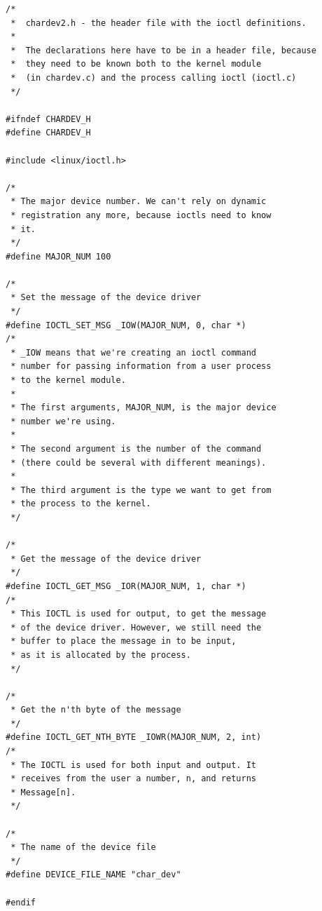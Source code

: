 \documentclass[11pt]{article}
\begin{document}
\begin{verbatim}
/*
 *  chardev2.h - the header file with the ioctl definitions.
 *
 *  The declarations here have to be in a header file, because
 *  they need to be known both to the kernel module
 *  (in chardev.c) and the process calling ioctl (ioctl.c)
 */

#ifndef CHARDEV_H
#define CHARDEV_H

#include <linux/ioctl.h>

/*
 * The major device number. We can't rely on dynamic
 * registration any more, because ioctls need to know
 * it.
 */
#define MAJOR_NUM 100

/*
 * Set the message of the device driver
 */
#define IOCTL_SET_MSG _IOW(MAJOR_NUM, 0, char *)
/*
 * _IOW means that we're creating an ioctl command
 * number for passing information from a user process
 * to the kernel module.
 *
 * The first arguments, MAJOR_NUM, is the major device
 * number we're using.
 *
 * The second argument is the number of the command
 * (there could be several with different meanings).
 *
 * The third argument is the type we want to get from
 * the process to the kernel.
 */

/*
 * Get the message of the device driver
 */
#define IOCTL_GET_MSG _IOR(MAJOR_NUM, 1, char *)
/*
 * This IOCTL is used for output, to get the message
 * of the device driver. However, we still need the
 * buffer to place the message in to be input,
 * as it is allocated by the process.
 */

/*
 * Get the n'th byte of the message
 */
#define IOCTL_GET_NTH_BYTE _IOWR(MAJOR_NUM, 2, int)
/*
 * The IOCTL is used for both input and output. It
 * receives from the user a number, n, and returns
 * Message[n].
 */

/*
 * The name of the device file
 */
#define DEVICE_FILE_NAME "char_dev"

#endif
\end{verbatim}
\end{document}
